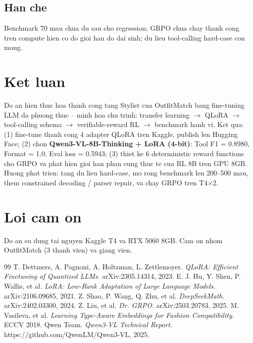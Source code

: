 \documentclass[12pt,a4paper]{article}
\begin{document}
\subsection{Han che}
Benchmark 70 mau chua du sau cho regression; GRPO chua chay thanh cong tren compute hien co
do gioi han do dai sinh; du lieu tool-calling hard-case con mong.
\section{Ket luan}
\label{sec:conclude}
Do an hien thuc hoa thanh cong tang Stylist cua OutfitMatch bang fine-tuning LLM da phuong
thuc -- minh hoa chu trinh: transfer learning $\rightarrow$ QLoRA $\rightarrow$ tool-calling
schema $\rightarrow$ verifiable-reward RL $\rightarrow$ benchmark hanh vi. Ket qua: (1) fine-tune
thanh cong 4 adapter QLoRA tren Kaggle, publish len Hugging Face; (2) chon \textbf{Qwen3-VL-8B-Thinking
+ LoRA (4-bit)}: Tool F1 = 0.8980, Format = 1.0, Eval loss = 0.5943; (3) thiet ke 6 deterministic
reward functions cho GRPO va phat hien gioi han phan cung thuc te cua RL 8B tren GPU 8GB.
Huong phat trien: tang du lieu hard-case, mo rong benchmark len 200--500 mau, them constrained
decoding / parser repair, va chay GRPO tren T4$\times$2.
\section*{Loi cam on}
Do an su dung tai nguyen Kaggle T4 va RTX 5060 8GB. Cam on nhom OutfitMatch (3 thanh vien) va giang vien.
\begin{thebibliography}{99}
 T. Dettmers, A. Pagnoni, A. Holtzman, L. Zettlemoyer. \emph{QLoRA: Efficient Finetuning of Quantized LLMs}. arXiv:2305.14314, 2023.
 E. J. Hu, Y. Shen, P. Wallis, et al. \emph{LoRA: Low-Rank Adaptation of Large Language Models}. arXiv:2106.09685, 2021.
 Z. Shao, P. Wang, Q. Zhu, et al. \emph{DeepSeekMath}. arXiv:2402.03300, 2024.
 Z. Liu, et al. \emph{Dr. GRPO}. arXiv:2503.20783, 2025.
 M. Vasileva, et al. \emph{Learning Type-Aware Embeddings for Fashion Compatibility}. ECCV 2018.
 Qwen Team. \emph{Qwen3-VL Technical Report}. https://github.com/QwenLM/Qwen3-VL, 2025.
\end{thebibliography}
\end{document}
